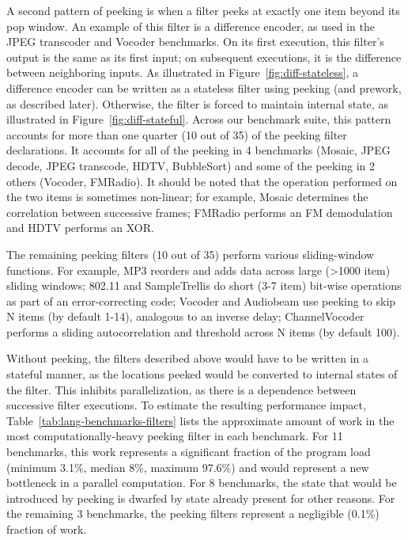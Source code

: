 A second pattern of peeking is when a filter peeks at exactly one item
beyond its pop window.  An example of this filter is a difference
encoder, as used in the JPEG transcoder and Vocoder benchmarks.  On
its first execution, this filter's output is the same as its first
input; on subsequent executions, it is the difference between
neighboring inputs.  As illustrated in
Figure~\ref{fig:diff-stateless}, a difference encoder can be written
as a stateless filter using peeking (and prework, as described later).
Otherwise, the filter is forced to maintain internal state, as
illustrated in Figure~\ref{fig:diff-stateful}.  Across our benchmark
suite, this pattern accounts for more than one quarter (10 out of 35)
of the peeking filter declarations.  It accounts for all of the
peeking in 4 benchmarks (Mosaic, JPEG decode, JPEG transcode, HDTV,
BubbleSort) and some of the peeking in 2 others (Vocoder, FMRadio).
It should be noted that the operation performed on the two items is
sometimes non-linear; for example, Mosaic determines the correlation
between successive frames; FMRadio performs an FM demodulation and
HDTV performs an XOR.

The remaining peeking filters (10 out of 35) perform various
sliding-window functions.  For example, MP3 reorders and adds data
across large (>1000 item) sliding windows;
802.11 and SampleTrellis do short (3-7 item) bit-wise operations as
part of an error-correcting code; Vocoder and Audiobeam use peeking to
skip N items (by default 1-14), analogous to an inverse delay;
ChannelVocoder performs a sliding autocorrelation and threshold across
N items (by default 100).

Without peeking, the filters described above would have to be written
in a stateful manner, as the locations peeked would be converted to
internal states of the filter.  This inhibits parallelization, as
there is a dependence between successive filter executions.  To
estimate the resulting performance impact,
Table~\ref{tab:lang-benchmarks-filters} lists the approximate amount
of work in the most computationally-heavy peeking filter in each
benchmark.  For 11 benchmarks, this work represents a significant
fraction of the program load (minimum 3.1\%, median 8\%, maximum
97.6\%) and would represent a new bottleneck in a parallel
computation.  For 8 benchmarks, the state that would be introduced by
peeking is dwarfed by state already present for other reasons.  For
the remaining 3 benchmarks, the peeking filters represent a negligible
(0.1\%) fraction of work.

